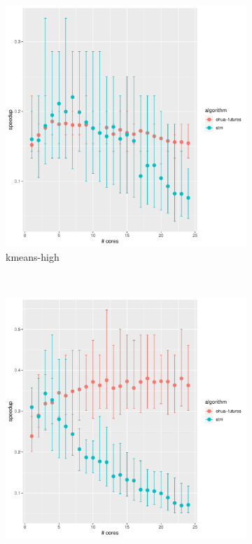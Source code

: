 \begin{figure}
    \begin{subfigure}[t]{.32\textwidth}
        \includegraphics[width=\textwidth,keepaspectratio]{gfx/results/kmeans/kmeans-high}
        \caption{kmeans-high}%
    \end{subfigure}%
    ~
    \begin{subfigure}[t]{.32\textwidth}
        \includegraphics[width=\textwidth,keepaspectratio]{gfx/results/kmeans/kmeans-high+}

\end{subfigure}
\end{figure}
